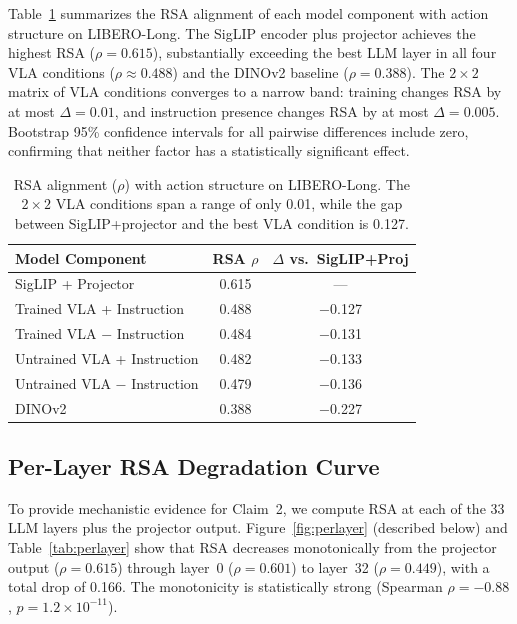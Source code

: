 \documentclass[10pt,letterpaper]{article}
\begin{document}
Table~\ref{tab:main_rsa} summarizes the RSA alignment of each model component with action structure on LIBERO-Long.
The SigLIP encoder plus projector achieves the highest RSA ($\rho{=}0.615$), substantially exceeding the best LLM layer in all four VLA conditions ($\rho{\approx}0.488$) and the DINOv2 baseline ($\rho{=}0.388$).
The $2{\times}2$ matrix of VLA conditions converges to a narrow band: training changes RSA by at most $\Delta{=}0.01$, and instruction presence changes RSA by at most $\Delta{=}0.005$.
Bootstrap 95\% confidence intervals for all pairwise differences include zero, confirming that neither factor has a statistically significant effect.

\begin{table}[t]
\centering
\caption{RSA alignment ($\rho$) with action structure on LIBERO-Long. The $2{\times}2$ VLA conditions span a range of only 0.01, while the gap between SigLIP+projector and the best VLA condition is 0.127.}
\label{tab:main_rsa}
\begin{tabular}{lcc}
\toprule
\textbf{Model Component} & \textbf{RSA $\rho$} & \textbf{$\Delta$ vs.\ SigLIP+Proj} \\
\midrule
SigLIP + Projector & 0.615 & --- \\
\midrule
Trained VLA + Instruction & 0.488 & $-$0.127 \\
Trained VLA $-$ Instruction & 0.484 & $-$0.131 \\
Untrained VLA + Instruction & 0.482 & $-$0.133 \\
Untrained VLA $-$ Instruction & 0.479 & $-$0.136 \\
\midrule
DINOv2 & 0.388 & $-$0.227 \\
\bottomrule
\end{tabular}
\end{table}


\subsection{Per-Layer RSA Degradation Curve}
\label{sec:exp_perlayer}

To provide mechanistic evidence for Claim~2, we compute RSA at each of the 33 LLM layers plus the projector output.
Figure~\ref{fig:perlayer} (described below) and Table~\ref{tab:perlayer} show that RSA decreases monotonically from the projector output ($\rho{=}0.615$) through layer~0 ($\rho{=}0.601$) to layer~32 ($\rho{=}0.449$), with a total drop of 0.166.
The monotonicity is statistically strong (Spearman $\rho{=}{-}0.88$, $p{=}1.2{\times}10^{-11}$).
\end{document}
